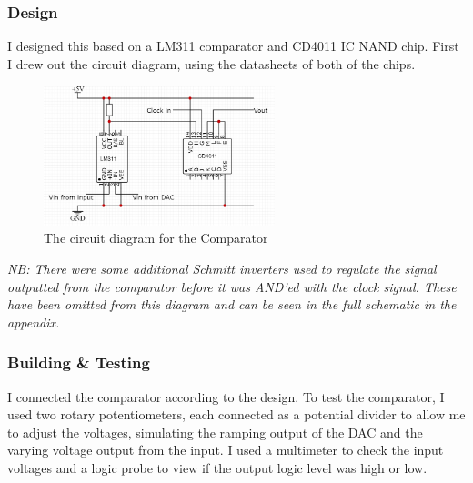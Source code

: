 \subsubsection{Design}
I designed this based on a LM311 comparator and CD4011 IC NAND chip. First I drew out the circuit diagram, using the datasheets of both of the chips.
\begin{figure}[H]
    \centering
    \includegraphics[width=0.6\textwidth]{images/comparatorCircuitDiagram.jpg}
    \caption{The circuit diagram for the Comparator}
    \label{fig:comparatorCircuitDiagram}
\end{figure}
\noindent \textit{NB: There were some additional Schmitt inverters used to regulate the signal outputted from the comparator before it was AND'ed with the clock signal. These have been omitted from this diagram and can be seen in the full schematic in the appendix.} 

\subsubsection{Building \& Testing}
I connected the comparator according to the design.
To test the comparator, I used two rotary potentiometers, each connected as a potential divider to allow me to adjust the voltages, simulating the ramping output of the DAC and the varying voltage output from the input. I used a multimeter to check the input voltages and a logic probe to view if the output logic level was high or low.

